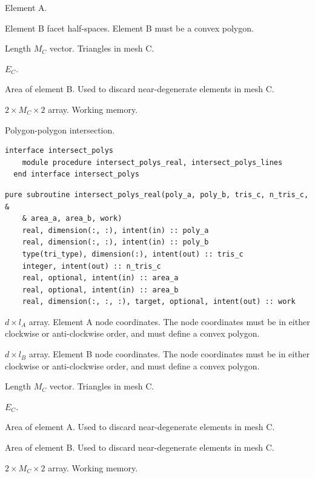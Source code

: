 \documentclass{article}
\begin{document}
\begin{description}[font=\ttfamily\bfseries,leftmargin=2.2\parindent,labelindent=1.7\parindent,noitemsep]
  \item[tri\_a] Element A.
  \item[lines\_b] Element B facet half-spaces. Element B must be a convex
    polygon.
  \item[tris\_c] Length $M_C$ vector. Triangles in mesh C.
  \item[n\_tris\_c] $E_C$.
  \item[area\_b] Area of element B. Used to discard near-degenerate elements in
    mesh C.
  \item[work] $2 \times M_C \times 2$ array. Working memory.
\end{description}

\noindent Polygon-polygon intersection.
  
\begin{lstlisting}[language=FORTRAN]
  interface intersect_polys
    module procedure intersect_polys_real, intersect_polys_lines
  end interface intersect_polys
\end{lstlisting}
  
\begin{lstlisting}[language=FORTRAN]
  pure subroutine intersect_polys_real(poly_a, poly_b, tris_c, n_tris_c, &
    & area_a, area_b, work)
    real, dimension(:, :), intent(in) :: poly_a
    real, dimension(:, :), intent(in) :: poly_b
    type(tri_type), dimension(:), intent(out) :: tris_c
    integer, intent(out) :: n_tris_c
    real, optional, intent(in) :: area_a
    real, optional, intent(in) :: area_b
    real, dimension(:, :, :), target, optional, intent(out) :: work
\end{lstlisting}

\begin{description}[font=\ttfamily\bfseries,leftmargin=2.2\parindent,labelindent=1.7\parindent,noitemsep]
  \item[poly\_a] $d \times l_A$ array. Element A node coordinates. The node
    coordinates must be in either clockwise or anti-clockwise order, and must
    define a convex polygon.
  \item[poly\_b] $d \times l_B$ array. Element B node coordinates. The node
    coordinates must be in either clockwise or anti-clockwise order, and must
    define a convex polygon.
  \item[tris\_c] Length $M_C$ vector. Triangles in mesh C.
  \item[n\_tris\_c] $E_C$.
  \item[area\_a] Area of element A. Used to discard near-degenerate elements in
    mesh C.
  \item[area\_b] Area of element B. Used to discard near-degenerate elements in
    mesh C.
  \item[work] $2 \times M_C \times 2$ array. Working memory.
\end{description}
\end{document}
